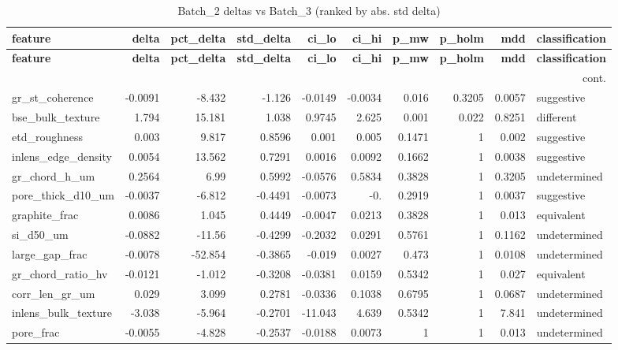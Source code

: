 \documentclass[11pt,a4paper]{article}
\begin{document}
\scriptsize
\begin{longtable}{lrrrrrrrrl}
\caption{Batch\_2 deltas vs Batch\_3 (ranked by abs. std delta)}\label{tab:deltaBatch_2}\\
\toprule
\textbf{feature} & \textbf{delta} & \textbf{pct\_delta} & \textbf{std\_delta} & \textbf{ci\_lo} & \textbf{ci\_hi} & \textbf{p\_mw} & \textbf{p\_holm} & \textbf{mdd} & \textbf{classification} \\
\midrule
\endfirsthead
\toprule \textbf{feature} & \textbf{delta} & \textbf{pct\_delta} & \textbf{std\_delta} & \textbf{ci\_lo} & \textbf{ci\_hi} & \textbf{p\_mw} & \textbf{p\_holm} & \textbf{mdd} & \textbf{classification} \\
\midrule
\endhead
\midrule\multicolumn{10}{r}{\footnotesize cont.}\\\midrule\endfoot
\bottomrule\endlastfoot
gr\_st\_coherence & -0.0091 & -8.432 & -1.126 & -0.0149 & -0.0034 & 0.016 & 0.3205 & 0.0057 & suggestive \\
bse\_bulk\_texture & 1.794 & 15.181 & 1.038 & 0.9745 & 2.625 & 0.001 & 0.022 & 0.8251 & different \\
etd\_roughness & 0.003 & 9.817 & 0.8596 & 0.001 & 0.005 & 0.1471 & 1 & 0.002 & suggestive \\
inlens\_edge\_density & 0.0054 & 13.562 & 0.7291 & 0.0016 & 0.0092 & 0.1662 & 1 & 0.0038 & suggestive \\
gr\_chord\_h\_um & 0.2564 & 6.99 & 0.5992 & -0.0576 & 0.5834 & 0.3828 & 1 & 0.3205 & undetermined \\
pore\_thick\_d10\_um & -0.0037 & -6.812 & -0.4491 & -0.0073 & -0. & 0.2919 & 1 & 0.0037 & suggestive \\
graphite\_frac & 0.0086 & 1.045 & 0.4449 & -0.0047 & 0.0213 & 0.3828 & 1 & 0.013 & equivalent \\
si\_d50\_um & -0.0882 & -11.56 & -0.4299 & -0.2032 & 0.0291 & 0.5761 & 1 & 0.1162 & undetermined \\
large\_gap\_frac & -0.0078 & -52.854 & -0.3865 & -0.019 & 0.0027 & 0.473 & 1 & 0.0108 & undetermined \\
gr\_chord\_ratio\_hv & -0.0121 & -1.012 & -0.3208 & -0.0381 & 0.0159 & 0.5342 & 1 & 0.027 & equivalent \\
corr\_len\_gr\_um & 0.029 & 3.099 & 0.2781 & -0.0336 & 0.1038 & 0.6795 & 1 & 0.0687 & undetermined \\
inlens\_bulk\_texture & -3.038 & -5.964 & -0.2701 & -11.043 & 4.639 & 0.5342 & 1 & 7.841 & undetermined \\
pore\_frac & -0.0055 & -4.828 & -0.2537 & -0.0188 & 0.0073 & 1 & 1 & 0.013 & undetermined \\

\end{longtable}
\end{document}
